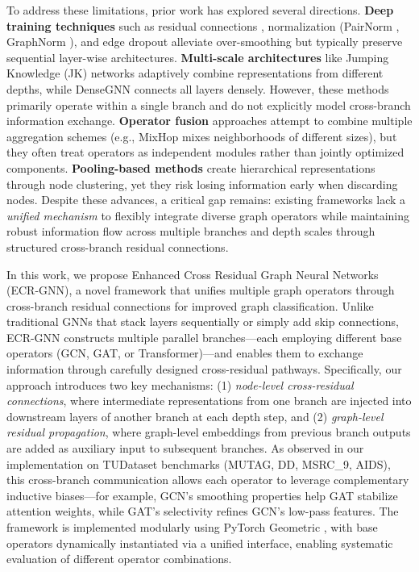 To address these limitations, prior work has explored several directions. \textbf{Deep training techniques} such as residual connections \cite{he2016deep, bresson2017residual}, normalization (PairNorm \cite{zhao2020pair}, GraphNorm \cite{cai2021graphnorm}), and edge dropout \cite{rong2019dropedge} alleviate over-smoothing but typically preserve sequential layer-wise architectures. \textbf{Multi-scale architectures} like Jumping Knowledge (JK) networks \cite{xu2018representation} adaptively combine representations from different depths, while DenseGNN \cite{du2024densegnn} connects all layers densely. However, these methods primarily operate within a single branch and do not explicitly model cross-branch information exchange. \textbf{Operator fusion} approaches attempt to combine multiple aggregation schemes (e.g., MixHop \cite{abu2019mixhop} mixes neighborhoods of different sizes), but they often treat operators as independent modules rather than jointly optimized components. \textbf{Pooling-based methods} \cite{ying2018hierarchical, lee2019self} create hierarchical representations through node clustering, yet they risk losing information early when discarding nodes. Despite these advances, a critical gap remains: existing frameworks lack a \textit{unified mechanism} to flexibly integrate diverse graph operators while maintaining robust information flow across multiple branches and depth scales through structured cross-branch residual connections.

In this work, we propose Enhanced Cross Residual Graph Neural Networks (ECR-GNN), a novel framework that unifies multiple graph operators through cross-branch residual connections for improved graph classification. Unlike traditional GNNs that stack layers sequentially or simply add skip connections, ECR-GNN constructs multiple parallel branches—each employing different base operators (GCN, GAT, or Transformer)—and enables them to exchange information through carefully designed cross-residual pathways. Specifically, our approach introduces two key mechanisms: (1) \textit{node-level cross-residual connections}, where intermediate representations from one branch are injected into downstream layers of another branch at each depth step, and (2) \textit{graph-level residual propagation}, where graph-level embeddings from previous branch outputs are added as auxiliary input to subsequent branches. As observed in our implementation on TUDataset benchmarks (MUTAG, DD, MSRC\_9, AIDS), this cross-branch communication allows each operator to leverage complementary inductive biases—for example, GCN's smoothing properties help GAT stabilize attention weights, while GAT's selectivity refines GCN's low-pass features. The framework is implemented modularly using PyTorch Geometric \cite{fey2019fast}, with base operators dynamically instantiated via a unified interface, enabling systematic evaluation of different operator combinations.

